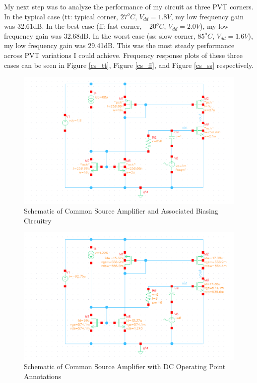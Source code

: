 \documentclass{article}
\begin{document}
My next step was to analyze the performance of my circuit as three PVT corners. In the typical case (tt: typical corner, $27^oC$, $V_{dd} = 1.8V$, my low frequency gain was 32.61dB. In the best case (ff: fast corner, $-20^oC$, $V_{dd} = 2.0V$), my low frequency gain was 32.68dB. In the worst case (ss: slow corner, $85^oC$, $V_{dd} = 1.6V$), my low frequency gain was 29.41dB. This was the most steady performance across PVT variations I could achieve. Frequency response plots of these three cases can be seen in Figure \ref{cs_tt}, Figure \ref{cs_ff}, and Figure \ref{cs_ss} respectively.

\begin{figure}[H]
\centering
\includegraphics[width=7in]{2_cs_schematic.png}
\caption{Schematic of Common Source Amplifier and Associated Biasing Circuitry}
\label{cs_schem}
\end{figure}

\begin{figure}[H]
\centering
\includegraphics[width=7in]{2_cs_dcop.png}
\caption{Schematic of Common Source Amplifier with DC Operating Point Annotations}
\label{cs_dcop}
\end{figure}
\end{document}
